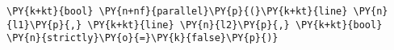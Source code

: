 \begin{Verbatim}[commandchars=\\\{\}]
    \PY{k+kt}{bool} \PY{n+nf}{parallel}\PY{p}{(}\PY{k+kt}{line} \PY{n}{l1}\PY{p}{,} \PY{k+kt}{line} \PY{n}{l2}\PY{p}{,} \PY{k+kt}{bool} \PY{n}{strictly}\PY{o}{=}\PY{k}{false}\PY{p}{)}
\end{Verbatim}
